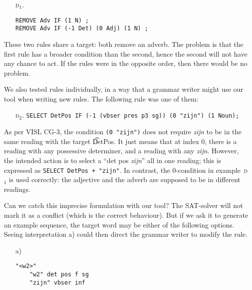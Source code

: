 {{\begin{itemize}
\item[\textsc{d$_1$.}] 
\begin{verbatim}
REMOVE Adv IF (1 N) ;
REMOVE Adv IF (-1 Det) (0 Adj) (1 N) ;
\end{verbatim}
\end{itemize}

\noindent These two rules share a target: both remove an adverb.
The problem is that the first rule has a broader condition than the second, hence the second will not have any chance to act. 
If the rules were in the opposite order, then there would be no problem.



We also tested rules individually, in a way that a grammar writer might use our tool when writing new rules.
The following rule was one of them:

\begin{itemize}
\item[\textsc{d$_2$.}] 
\texttt{SELECT DetPos IF (-1 (vbser pres p3 sg)) (0 "zijn") (1 Noun);}
\end{itemize} 

\noindent As per VISL CG-3, the condition \texttt{(0 "zijn")} does not require
 \emph{zijn} to be in the same reading with the target \t{DetPos}.
It just means that at index 0,
there is a reading with any possessive determiner, and a reading with any \emph{zijn}.
However, the intended action is to select a ``det pos \emph{zijn}'' all in one reading;
this is expressed as \texttt{SELECT DetPos + "zijn"}.
In contrast, the 0-condition in example~\textsc{d$_1$} is used correctly:
the adjective and the adverb are supposed to be in different readings.


Can we catch this imprecise formulation with our tool? The SAT-solver will not mark it as a conflict (which is the correct behaviour). But if we ask it to generate an example sequence, the target word may be either of the following options. Seeing interpretation a) could then direct the grammar writer to modify the rule.

\begin{itemize}
\item[a)] \begin{verbatim}
"<w2>"
    "w2" det pos f sg
    "zijn" vbser inf
\end{verbatim}


\end{itemize}}}
